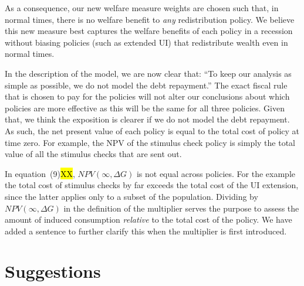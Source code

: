 \documentclass[12pt,letterpaper,english]{article}
\begin{document}
\begin{itemize}
	As a consequence, our new welfare measure weights are chosen such that, in normal times, there is no welfare benefit to \textit{any} redistribution policy. We believe this new measure best captures the welfare benefits of each policy in a recession without biasing policies (such as extended UI) that redistribute wealth even in normal times.
	
	In the description of the model, we are now clear that: ``To keep our analysis as simple as possible, we do not model the debt repayment.'' The exact fiscal rule that is chosen to pay for the policies will not alter our conclusions about which policies are more effective as this will be the same for all three policies. Given that, we think the exposition is clearer if we do not model the debt repayment. As such, the net present value of each policy is equal to the total cost of policy at time zero. For example, the NPV of the stimulus check policy is simply the total value of all the stimulus checks that are sent out. 
	
	In equation~(9)\hl{XX}, $NPV(\infty,\Delta G)$ is not equal across policies. For the example the total cost of stimulus checks by far exceeds the total cost of the UI extension, since the latter applies only to a subset of the population. Dividing by $NPV(\infty,\Delta G)$ in the definition of the multiplier serves the purpose to assess the amount of induced consumption \textit{relative} to the total cost of the policy. We have added a sentence to further clarify this when the multiplier is first introduced.

\end{itemize}

\section{Suggestions}
\end{document}

